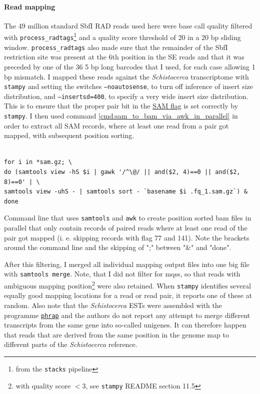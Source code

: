 \documentclass[a4paper,12pt,times,print,index,custombib,custommargin]{PhDThesisPSnPDF}\usepackage[]{graphicx}\usepackage[]{color}
\begin{document}
\paragraph{Read mapping}
The 49 million standard SbfI RAD reads used here were base call quality filtered with \texttt{process\_radtags}\footnote{from the \texttt{stacks} pipeline} and a quality score threshold of 20 in a 20 bp sliding window. \texttt{process\_radtags} also made sure that the remainder of the SbfI restriction site was present at the 6th position in the SE reads and that it was preceded by one of the 36 5 bp long \glspl{barcode} that I used, for each case allowing 1 bp mismatch. I mapped these reads against the \textit{Schistocerca} transcriptome \citep{Badisco2011} with \texttt{stampy} \citep{Lunter2011} and setting the switches \texttt{--noautosense}, to turn off inference of insert size distribution, and \texttt{--insertsd=400}, to specify a very wide insert size distribution. This is to ensure that the \gls{proper pair}  bit in the \href{http://samtools.github.io/hts-specs/SAMv1.pdf}{SAM flag} is set correctly by \texttt{stampy}. I then used command \ref{cmd:sam_to_bam_via_awk_in_parallel} in order to extract all \gls{SAM} records, where at least one read from a pair got mapped, with subsequent position sorting.
%
\begin{cmd}
\captionsetup{type=cmd} %
\begin{Verbatim}[fontsize=\scriptsize, formatcom=\color{darkgray}]

for i in *sam.gz; \
do (samtools view -hS $i | gawk '/^\@/ || and($2, 4)==0 || and($2, 8)==0' | \
samtools view -uhS - | samtools sort - `basename $i .fq_1.sam.gz`) & done
\end{Verbatim}
\caption{\small Command line that uses \texttt{samtools} and \texttt{awk} to create position sorted bam files in parallel that only contain records of paired reads where at least one read of the pair got mapped (i. e. skipping records with flag 77 and 141). \scriptsize{Note the brackets around the command line and the skipping of ";" between "\&" and "done"}. }
\label{cmd:sam_to_bam_via_awk_in_parallel}
\end{cmd}
%
After this filtering, I merged all individual mapping output files into one big file with \texttt{samtools merge}.
Note, that I did not filter for \glspl{mqs}, so that reads with ambiguous mapping position\footnote{with quality score $<3$, see \texttt{stampy} README section 11.5} were also retained. When \texttt{stampy} identifies several equally good mapping locations for a read or read pair, it reports one of these at random. Also note that the \textit{Schistocerca} \glspl{EST} were assembled with the programme \href{http://www.phrap.org/phredphrap/general.html}{\texttt{phrap}} and the authors do not report any attempt to merge different transcripts from the same gene into so-called unigenes. It can therefore happen that reads that are derived from the same position in the genome map to different parts of the \textit{Schistocerca} reference.
\end{document}
